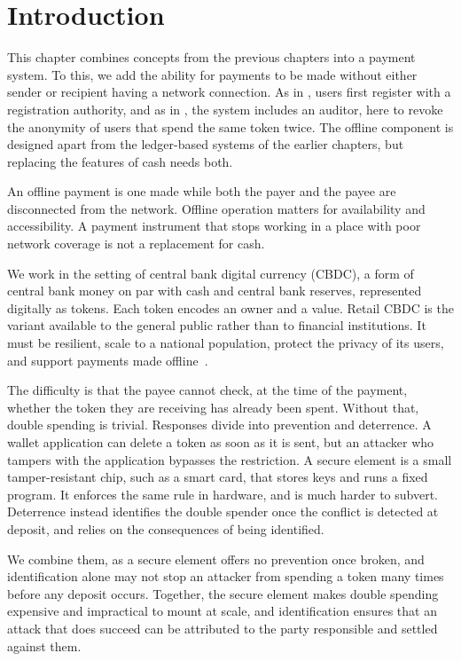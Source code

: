 \section{Introduction}\label{sec:offline-intro}

This chapter combines concepts from the previous chapters into a payment
system. To this, we add the ability for payments to be made without either
sender or recipient having a network connection. As in ,
users first register with a registration authority, and as in
, the system includes an auditor, here to revoke the anonymity of users that
spend the same token twice. The offline component is designed apart from the
ledger-based systems of the earlier chapters, but replacing the features of cash
needs both.

An offline payment is one made while both the payer and the payee are
disconnected from the network. Offline operation matters for availability and
accessibility. A payment instrument that stops working in a place with poor
network coverage is not a replacement for cash.

We work in the setting of central bank digital currency (CBDC), a form of
central bank money on par with cash and central bank reserves,
represented digitally as tokens. Each token encodes an owner and a value.
Retail CBDC is the variant available to the general public rather than to
financial institutions. It must be
resilient, scale to a national population, protect the privacy of its users,
and support payments made
offline~\cite{cbdctracker,digitaleuro2023,aboulaiz2024offline}.

The difficulty is that the payee cannot check, at the time of the payment,
whether the token they are receiving has already been spent. Without that,
double spending is trivial. Responses divide into prevention and deterrence. A
wallet application can delete a token as soon as it is sent, but an attacker
who tampers with the application bypasses the restriction. A secure element is
a small tamper-resistant chip, such as a smart card, that stores keys and runs
a fixed program. It enforces the same rule in hardware, and is much harder to
subvert. Deterrence instead identifies the double spender once the conflict is
detected at deposit, and relies on the consequences of being identified.

We combine them, as a secure element offers no prevention once broken, and
identification alone may not stop an attacker from spending a token many times
before any deposit occurs.  Together, the secure element makes double spending
expensive and impractical to mount at scale, and identification ensures that an
attack that does succeed can be attributed to the party responsible and settled
against them.

